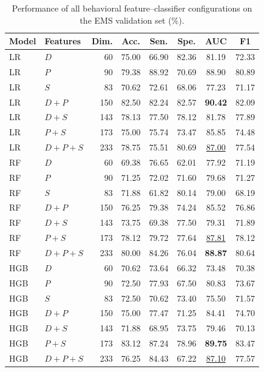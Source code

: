 \documentclass[conference,a4paper]{IEEEtran}
\begin{document}
\begin{table}[t]
\caption{Performance of all behavioral feature--classifier configurations on the EMS validation set (\%).}
\label{tab:ml_results}
\centering
\footnotesize
\setlength{\tabcolsep}{4.2pt}
\begin{tabular}{llrccccc}
\toprule
Model & Features & Dim. & Acc. & Sen. & Spe. & AUC & F1 \\
\midrule
LR & $D$ & 60 & 75.00 & 66.90 & 82.36 & 81.19 & 72.33 \\
LR & $P$ & 90 & 79.38 & 88.92 & 70.69 & 88.90 & 80.89 \\
LR & $S$ & 83 & 70.62 & 72.61 & 68.06 & 77.23 & 71.17 \\
LR & $D+P$ & 150 & 82.50 & 82.24 & 82.57 & \textbf{90.42} & 82.09 \\
LR & $D+S$ & 143 & 78.13 & 77.50 & 78.12 & 81.78 & 77.89 \\
LR & $P+S$ & 173 & 75.00 & 75.74 & 73.47 & 85.85 & 74.48 \\
LR & $D+P+S$ & 233 & 78.75 & 75.51 & 80.69 & \underline{87.00} & 77.54 \\
\midrule
RF & $D$ & 60 & 69.38 & 76.65 & 62.01 & 77.92 & 71.19 \\
RF & $P$ & 90 & 71.25 & 72.02 & 71.60 & 79.68 & 71.27 \\
RF & $S$ & 83 & 71.88 & 61.82 & 80.14 & 79.00 & 68.19 \\
RF & $D+P$ & 150 & 76.25 & 79.38 & 74.24 & 85.52 & 76.86 \\
RF & $D+S$ & 143 & 73.75 & 69.38 & 77.50 & 79.31 & 71.89 \\
RF & $P+S$ & 173 & 78.12 & 79.72 & 77.64 & \underline{87.81} & 78.12 \\
RF & $D+P+S$ & 233 & 80.00 & 84.26 & 76.04 & \textbf{88.87} & 80.64 \\
\midrule
HGB & $D$ & 60 & 70.62 & 73.64 & 66.32 & 73.48 & 70.38 \\
HGB & $P$ & 90 & 72.50 & 77.93 & 67.50 & 80.83 & 73.67 \\
HGB & $S$ & 83 & 72.50 & 70.62 & 73.40 & 75.50 & 71.57 \\
HGB & $D+P$ & 150 & 75.00 & 77.47 & 71.25 & 84.41 & 74.70 \\
HGB & $D+S$ & 143 & 71.88 & 68.95 & 73.75 & 79.46 & 70.13 \\
HGB & $P+S$ & 173 & 83.12 & 87.24 & 78.96 & \textbf{89.75} & 83.47 \\
HGB & $D+P+S$ & 233 & 76.25 & 84.43 & 67.22 & \underline{87.10} & 77.57 \\
\bottomrule
\end{tabular}
\end{table}
\end{document}
